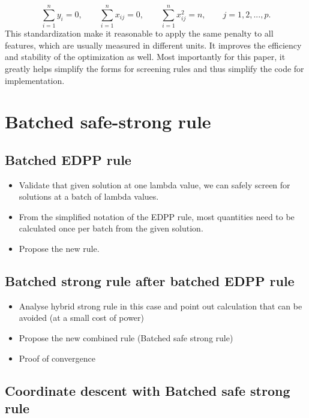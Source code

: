 \documentclass{article}
\begin{document}
\begin{equation}
    \sum_{i=1}^ny_i=0, \qquad \sum_{i=1}^n x_{ij}=0, \qquad \sum_{i=1}^n x_{ij}^2=n,\qquad j=1,2,...,p.
\end{equation}
This standardization make it reasonable to apply the same penalty to all features, which are usually measured in different units. It improves the efficiency and stability of the optimization as well. Most importantly for this paper, it greatly helps simplify the forms for screening rules and thus simplify the code for implementation.

\subsection{}

\section{Batched safe-strong rule}
\label{sec:method}

\subsection{Batched EDPP rule}
\begin{itemize}
    \item Validate that given solution at one lambda value, we can safely screen for solutions at a batch of lambda values.
    \item From the simplified notation of the EDPP rule, most quantities need to be calculated once per batch from the given solution.
    \item Propose the new rule.
\end{itemize}

\subsection{Batched strong rule after batched EDPP rule}
\begin{itemize}
    \item Analyse hybrid strong rule in this case and point out calculation that can be avoided (at a small cost of power)
    \item Propose the new combined rule (Batched safe strong rule)
    \item Proof of convergence
\end{itemize}

\subsection{Coordinate descent with Batched safe strong rule}
\end{document}
